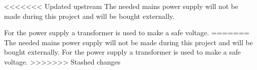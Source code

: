 <<<<<<< Updated upstream
The needed mains power supply will not be made during this project and will be bought externally.

\noindent For the power supply a transformer is used to make a safe voltage.
=======
The needed mains power supply will not be made during this project and will be bought externally.
For the power supply a transformer is used to make a safe voltage.
>>>>>>> Stashed changes
